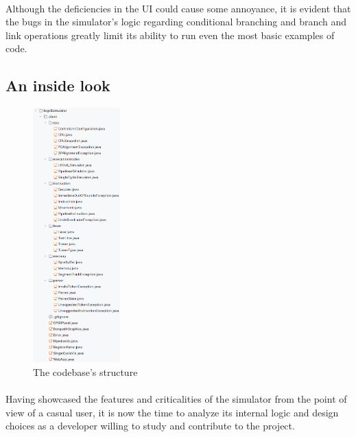 \paragraph{}
Although the deficiencies in the UI could cause some annoyance, it is evident that the bugs in the simulator's logic regarding conditional branching and branch and link operations greatly limit its ability to run even the most basic examples of code.

\subsection{An inside look}\label{chap:chap1insidelook}
\begin{figure}
	\centering
	\includegraphics[width=0.3\textwidth]{img/classes.png}
	\caption{The codebase's structure}
        \label{fig:codebase}
\end{figure}
\paragraph{}
Having showcased the features and criticalities of the simulator from the point of view of a casual user, it is now the time to analyze its internal logic and design choices as a developer willing to study and contribute to the project.
